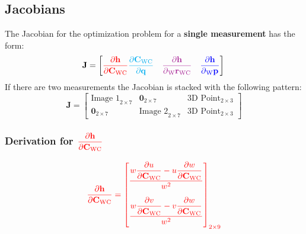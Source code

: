 \documentclass{report}
\renewcommand{\Vec}[1]{{\mathbf{#1}}}
\newcommand{\Mat}[1]{{\mathbf{#1}}}
\newcommand{\Zeros}[2]{{\Vec{0}_{#1\times#2}}}
\newcommand{\quat}{{\Vec{q}}}
\newcommand{\jac}{{\Mat{J}}}
\newcommand{\cam}{{\text{C}}}
\newcommand{\world}{{\text{W}}}
\newcommand{\KineNotationTransform}[3]{{{#1}_{#2#3}}}
\newcommand{\KineNotation}[3]{{{{}_{#2}} {#1}_{#2#3}}}
\newcommand{\KineNotationPart}[3]{{{{}_{#2}} {#1}_{#3}}}
\newcommand{\pos}{{\Vec{r}}}
\newcommand{\Pos}[2]{{\KineNotation{\pos}{#1}{#2}}}
\newcommand{\rot}{{\Mat{C}}}
\newcommand{\Rot}[2]{{\KineNotationTransform{\rot}{#1}{#2}}}
\newcommand{\point}{\Vec{p}}
\newcommand{\Pt}[1]{{\KineNotationPart{\point}{#1}{}}}
\newcommand{\camRot}{{\Rot{\world}{\cam}}}
\newcommand{\camPos}{{\Pos{\world}{\cam}}}
\newcommand{\projFunc}{{\Vec{h}}}
\begin{document}
\subsection*{Jacobians}

The Jacobian for the optimization problem for a \textbf{single measurement} has
the form:
%
\begin{equation}
  \jac = \begin{bmatrix}
    \color{red}
    \dfrac{\partial{\projFunc}}{\partial \camRot}
    \color{cyan}
    \dfrac{\partial{\camRot}}{\partial{\quat}} \quad
    \color{Mulberry}
    \dfrac{\partial{\projFunc}}{\partial \camPos} \quad
    \color{blue}
    \dfrac{\partial{\projFunc}}{\partial \Pt{\world}}
  \end{bmatrix} \\
\end{equation}
%
If there are two measurements the Jacobian is stacked with the following
pattern:
%
\begin{equation}
  \jac = \begin{bmatrix}
    \text{Image 1}_{2 \times 7}
      & \Zeros{2}{7}
      & \text{3D Point}_{2 \times 3} \\
    \Zeros{2}{7}
      & \text{Image 2}_{2 \times 7}
      & \text{3D Point}_{2 \times 3}
  \end{bmatrix}
\end{equation}


\subsubsection*{Derivation for
$\color{red}
\dfrac{\partial{\projFunc}}{\partial{\camRot}}$}

\begin{align}
  \color{red}
  \dfrac{\partial{\projFunc}}{\partial{\camRot}} =
  \begin{bmatrix}
    \dfrac{
      w \dfrac{\partial{u}}{\partial{\camRot}} -
      u \dfrac{\partial{w}}{\partial{\camRot}}
    }{w^{2}} \vspace{1.0em} \\
    \dfrac{
      w \dfrac{\partial{v}}{\partial{\camRot}} -
      v \dfrac{\partial{w}}{\partial{\camRot}}
    }{w^{2}} \vspace{0.5em}
  \end{bmatrix}_{2 \times 9}
\end{align}
\end{document}
